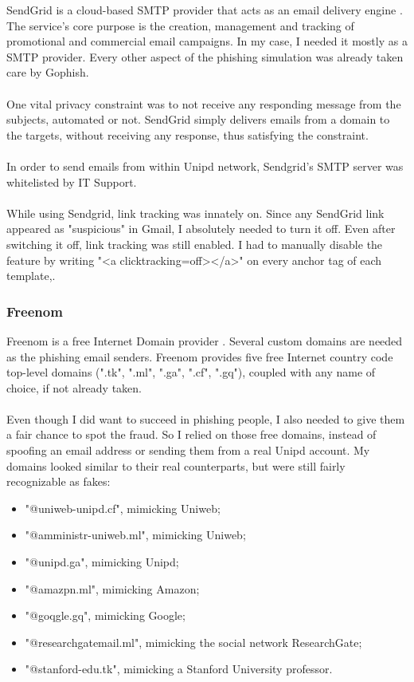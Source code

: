 \documentclass[a4paper]{article}
\begin{document}
SendGrid is a cloud-based SMTP provider that acts as an email delivery engine \cite{tools-sendgrid}. The service's core purpose is the creation, management and tracking of promotional and commercial email campaigns. In my case, I needed it mostly as a SMTP provider. Every other aspect of the phishing simulation was already taken care by Gophish. 
\\ \\
One vital privacy constraint was to not receive any responding message from the subjects, automated or not. SendGrid simply delivers emails from a domain to the targets, without receiving any response, thus satisfying the constraint.
\\ \\
In order to send emails from within Unipd network, Sendgrid's SMTP server was whitelisted by IT Support.
\\ \\
While using Sendgrid, link tracking was innately on. Since any SendGrid link appeared as "suspicious" in Gmail, I absolutely needed to turn it off. Even after switching it off, link tracking was still enabled. I had to manually disable the feature by writing "<a clicktracking=off></a>" on every anchor tag of each template,.

\subsubsection{Freenom}

Freenom is a free Internet Domain provider \cite{tools-freenom}. Several custom domains are needed as the phishing email senders. Freenom provides five free Internet country code top-level domains (".tk", ".ml", ".ga", ".cf", ".gq"), coupled with any name of choice, if not already taken.
\\ \\
Even though I did want to succeed in phishing people, I also needed to give them a fair chance to spot the fraud. So I relied on those free domains, instead of spoofing an email address or sending them from a real Unipd account. My domains looked similar to their real counterparts, but were still fairly recognizable as fakes:

\begin{itemize}
    \item "@uniweb-unipd.cf", mimicking Uniweb;
    \item "@amministr-uniweb.ml", mimicking Uniweb;
    \item "@unipd.ga", mimicking Unipd;
    \item "@amazpn.ml", mimicking Amazon;
    \item "@goqgle.gq", mimicking Google;
    \item "@researchgatemail.ml", mimicking the social network ResearchGate;
    \item "@stanford-edu.tk", mimicking a Stanford University professor.
\end{itemize}
\end{document}
